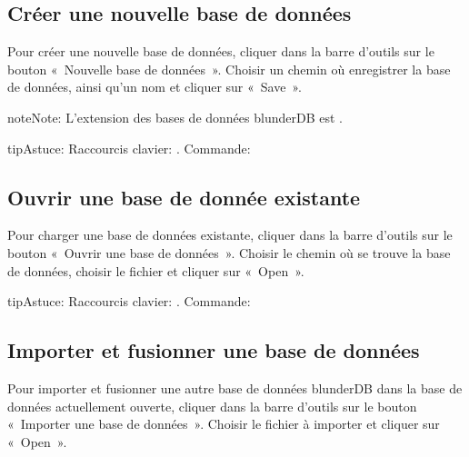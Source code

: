 \documentclass[letterpaper,10pt,french]{sphinxmanual}
\begin{document}
\subsection{Créer une nouvelle base de données}
\label{\detokenize{guide_utilisateur:creer-une-nouvelle-base-de-donnees}}
\sphinxAtStartPar
Pour créer une nouvelle base de données, cliquer dans la barre d’outils sur le
bouton « Nouvelle base de données ». Choisir un chemin où enregistrer la base de
données, ainsi qu’un nom et cliquer sur « Save ».

\begin{sphinxadmonition}{note}{Note:}
\sphinxAtStartPar
L’extension des bases de données blunderDB est .
\end{sphinxadmonition}

\begin{sphinxadmonition}{tip}{Astuce:}
\sphinxAtStartPar
Raccourcis clavier: . Commande: 
\end{sphinxadmonition}


\subsection{Ouvrir une base de donnée existante}
\label{\detokenize{guide_utilisateur:ouvrir-une-base-de-donnee-existante}}
\sphinxAtStartPar
Pour charger une base de données existante, cliquer dans la barre d’outils sur
le bouton « Ouvrir une base de données ». Choisir le chemin où se trouve la base
de données, choisir le fichier  et cliquer sur « Open ».

\begin{sphinxadmonition}{tip}{Astuce:}
\sphinxAtStartPar
Raccourcis clavier: . Commande: 
\end{sphinxadmonition}


\subsection{Importer et fusionner une base de données}
\label{\detokenize{guide_utilisateur:importer-et-fusionner-une-base-de-donnees}}
\sphinxAtStartPar
Pour importer et fusionner une autre base de données blunderDB dans la base de
données actuellement ouverte, cliquer dans la barre d’outils sur le bouton
« Importer une base de données ». Choisir le fichier  à importer et
cliquer sur « Open ».
\end{document}
